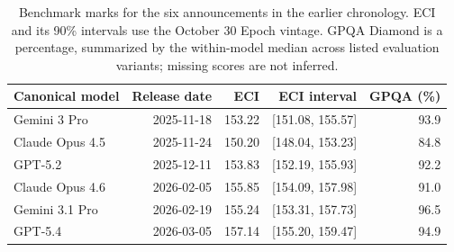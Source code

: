 \begin{table}[H]
\centering
\small
\caption{Benchmark marks for the six announcements in the earlier chronology. ECI and its 90\% intervals use the October 30 Epoch vintage. GPQA Diamond is a percentage, summarized by the within-model median across listed evaluation variants; missing scores are not inferred.}\label{tab:release-marks}
\begin{tabular}{lrrrr}
\toprule
Canonical model & Release date & ECI & ECI interval & GPQA (\%) \\
\midrule
Gemini 3 Pro & 2025-11-18 & 153.22 & [151.08, 155.57] & 93.9 \\
Claude Opus 4.5 & 2025-11-24 & 150.20 & [148.04, 153.23] & 84.8 \\
GPT-5.2 & 2025-12-11 & 153.83 & [152.19, 155.93] & 92.2 \\
Claude Opus 4.6 & 2026-02-05 & 155.85 & [154.09, 157.98] & 91.0 \\
Gemini 3.1 Pro & 2026-02-19 & 155.24 & [153.31, 157.73] & 96.5 \\
GPT-5.4 & 2026-03-05 & 157.14 & [155.20, 159.47] & 94.9 \\
\bottomrule
\end{tabular}
\end{table}
